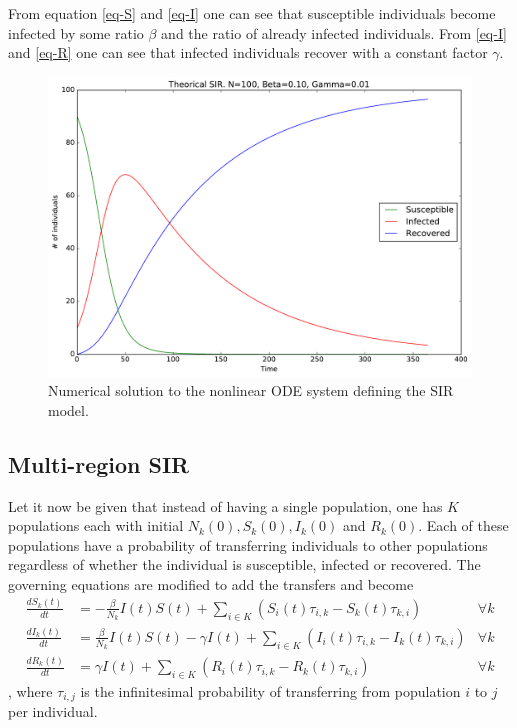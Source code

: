 From equation \eqref{eq-S} and \eqref{eq-I} one can see that susceptible individuals become infected by some ratio $\beta$ and the ratio of already infected individuals. From \eqref{eq-I} and \eqref{eq-R} one can see that infected individuals recover with a constant factor $\gamma$. 

\begin{figure}[H]
	\centering
	\includegraphics[width= 1.0 \linewidth]{plots/sir_one_region.pdf}
	\caption{Numerical solution to the nonlinear ODE system defining the SIR model.}
\end{figure}

\subsection{Multi-region SIR}
Let it now be given that instead of having a single population, one has $K$ populations each with initial $N_k(0), S_k(0), I_k(0)$ and $R_k(0)$. Each of these populations have a probability of transferring individuals to other populations regardless of whether the individual is susceptible, infected or recovered. The governing equations are modified to add the transfers and become
\begin{align}
\frac{d S_k(t)}{dt} &= - \frac{\beta}{N_k} I(t) S(t) + \sum_{i\in K} \left( S_i(t)\tau_{i,k} - S_k(t)\tau_{k, i}\right)   &\forall k\\
\frac{d I_k(t)}{dt} &= \frac{\beta}{N_k} I(t) S(t) - \gamma I(t) + \sum_{i\in K} \left( I_i(t)\tau_{i,k} - I_k(t)\tau_{k, i}\right)  &\forall k\\
\frac{d R_k(t)}{dt} &= \gamma I(t) + \sum_{i\in K} \left( R_i(t)\tau_{i,k} - R_k(t)\tau_{k, i}\right) &\forall k
\end{align}
, where $\tau_{i,j}$ is the infinitesimal probability of transferring from population $i$ to $j$ per individual.

